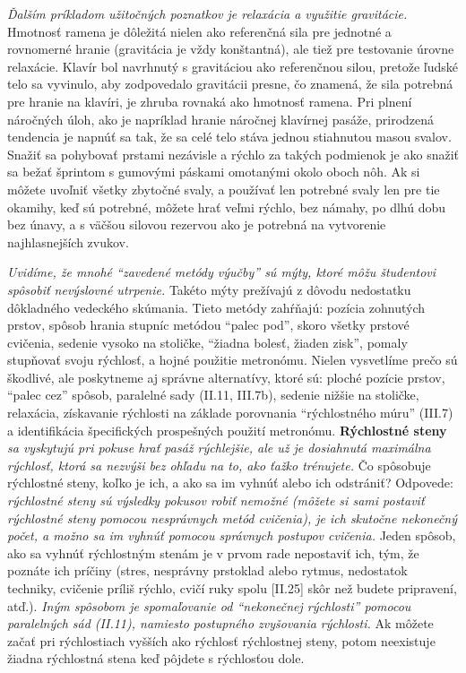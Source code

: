 \emph{Ďalším príkladom užitočných poznatkov je relaxácia a využitie gravitácie.} Hmotnosť ramena je dôležitá nielen ako referenčná sila pre jednotné a rovnomerné hranie (gravitácia je vždy konštantná), ale tiež pre testovanie úrovne relaxácie. Klavír bol navrhnutý s gravitáciou ako referenčnou silou, pretože ľudské telo sa vyvinulo, aby zodpovedalo gravitácii presne, čo znamená, že sila potrebná pre hranie na klavíri, je zhruba rovnaká ako hmotnosť ramena. Pri plnení náročných úloh, ako je napríklad hranie náročnej klavírnej pasáže, prirodzená tendencia je napnúť sa tak, že sa celé telo stáva jednou stiahnutou masou svalov. Snažiť sa pohybovať prstami nezávisle a rýchlo za takých podmienok je ako snažiť sa bežať šprintom s gumovými páskami omotanými okolo oboch nôh. Ak si môžete uvoľniť všetky zbytočné svaly, a používať len potrebné svaly len pre tie okamihy, keď sú potrebné, môžete hrať veľmi rýchlo, bez námahy, po dlhú dobu bez únavy, a s väčšou silovou rezervou ako je potrebná na vytvorenie najhlasnejších zvukov.

\emph{Uvidíme, že mnohé “zavedené metódy výučby” sú mýty, ktoré môžu študentovi spôsobiť nevýslovné utrpenie.} Takéto mýty prežívajú z dôvodu nedostatku dôkladného vedeckého skúmania. Tieto metódy zahŕňajú: pozícia zohnutých prstov, spôsob hrania stupníc metódou “palec pod”, skoro všetky prstové cvičenia, sedenie vysoko na stoličke, “žiadna bolesť, žiaden zisk”, pomaly stupňovať svoju rýchlosť, a hojné použitie metronómu. Nielen vysvetlíme prečo sú škodlivé, ale poskytneme aj správne alternatívy, ktoré sú: ploché pozície prstov, “palec cez” spôsob, paralelné sady (II.11, III.7b), sedenie nižšie na stoličke, relaxácia, získavanie rýchlosti na základe porovnania “rýchlostného múru” (III.7) a identifikácia špecifických prospešných použití metronómu. \textbf{Rýchlostné steny} \emph{sa vyskytujú pri pokuse hrať pasáž rýchlejšie, ale už je dosiahnutá maximálna rýchlosť, ktorá sa nezvýši bez ohľadu na to, ako ťažko trénujete.} Čo spôsobuje rýchlostné steny, koľko je ich, a ako sa im vyhnúť alebo ich odstrániť? Odpovede: \emph{rýchlostné steny sú výsledky pokusov robiť nemožné (môžete si sami postaviť rýchlostné steny pomocou nesprávnych metód cvičenia), je ich skutočne nekonečný počet, a možno sa im vyhnúť pomocou správnych postupov cvičenia.} Jeden spôsob, ako sa vyhnúť rýchlostným stenám je v prvom rade nepostaviť ich, tým, že poznáte ich príčiny (stres, nesprávny prstoklad alebo rytmus, nedostatok techniky, cvičenie príliš rýchlo, cvičí ruky spolu [II.25] skôr než budete pripravení, atď.). \emph{Iným spôsobom je spomaľovanie od “nekonečnej rýchlosti” pomocou paralelných sád (II.11), namiesto postupného zvyšovania rýchlosti.} Ak môžete začať pri rýchlostiach vyšších ako rýchlosť rýchlostnej steny, potom neexistuje žiadna rýchlostná stena keď pôjdete s rýchlosťou dole.

